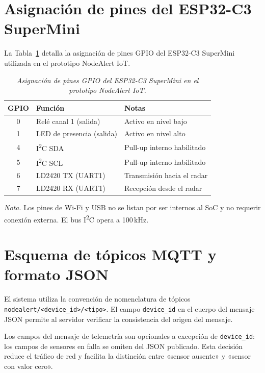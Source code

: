 
\section{Asignación de pines del ESP32-C3 SuperMini}
\label{anx:pines}

La Tabla~\ref{tab:pines} detalla la asignación de pines GPIO del ESP32-C3 SuperMini
utilizada en el prototipo NodeAlert IoT.

\begin{table}[htbp]
  \caption{\textit{Asignación de pines GPIO del ESP32-C3 SuperMini en el prototipo NodeAlert IoT.}}
  \label{tab:pines}
  \centering
  \small
  \begin{tabular}{@{}cll@{}}
    \toprule
    \textbf{GPIO} & \textbf{Función} & \textbf{Notas} \\
    \midrule
    0 & Relé canal 1 (salida) & Activo en nivel bajo \\
    1 & LED de presencia (salida) & Activo en nivel alto \\
    4 & I\textsuperscript{2}C SDA & Pull-up interno habilitado \\
    5 & I\textsuperscript{2}C SCL & Pull-up interno habilitado \\
    6 & LD2420 TX (UART1) & Transmisión hacia el radar \\
    7 & LD2420 RX (UART1) & Recepción desde el radar \\
    \bottomrule
  \end{tabular}
  \vspace{4pt}

  \noindent\textit{Nota.} Los pines de Wi-Fi y USB no se listan por ser internos al SoC
  y no requerir conexión externa. El bus I\textsuperscript{2}C opera a 100\,kHz.
\end{table}

\section{Esquema de tópicos MQTT y formato JSON}
\label{anx:mqtt}

El sistema utiliza la convención de nomenclatura de tópicos
\texttt{nodealert/<device\_id>/<tipo>}. El campo \texttt{device\_id} en el cuerpo
del mensaje JSON permite al servidor verificar la consistencia del origen del mensaje.

Los campos del mensaje de telemetría son opcionales a excepción de \texttt{device\_id}:
los campos de sensores en falla se omiten del JSON publicado. Esta decisión reduce
el tráfico de red y facilita la distinción entre «sensor ausente» y «sensor con
valor cero».


